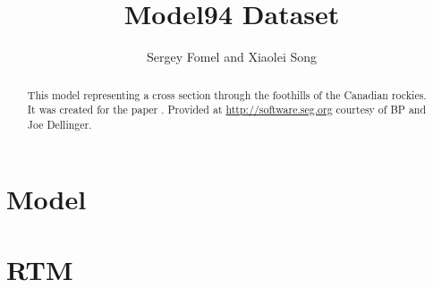 \author{Sergey Fomel and Xiaolei Song}
\title{Model94 Dataset}

\maketitle

\begin{abstract}
  This model representing a cross section through the foothills of the
  Canadian rockies. It was created for the paper
  \cite[]{CAN31-01-00180024-02}. Provided at
  \url{http://software.seg.org} courtesy of BP and Joe Dellinger.
\end{abstract}

\section{Model}

 \clearpage
{} \clearpage
{} \clearpage

\section{RTM}
 \clearpage


